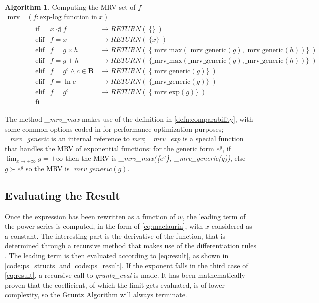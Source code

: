 \documentclass{article}
\theoremstyle{plain}
\theoremstyle{definition}
\theoremstyle{algorithm}
\newtheorem*{algo*}{Algorithm}
\begin{document}
	\begin{algo*}
		Computing the MRV set of \(f\) \\
		\[
		\begin{aligned}
			\text{mrv}\:&(f : \text{exp-log function in} \: x) \\
			&\begin{aligned}
				&\text{if} &x \ntriangleleft f & \rightarrow RETURN(\:\{\}\:) \\
				&\text{elif} &f = x & \rightarrow RETURN(\:\{x\}\:) \\
				&\text{elif} &f = g \times h & \rightarrow RETURN(\:\{\text{\_mrv\_max}(\text{\_mrv\_generic}(g), \text{\_mrv\_generic}(h))\}\:) \\
				&\text{elif} &f = g + h & \rightarrow RETURN(\:\{\text{\_mrv\_max}(\text{\_mrv\_generic}(g), \text{\_mrv\_generic}(h))\}\:) \\
				&\text{elif} &f = g^{c} \wedge c \in \mathbf{R} & \rightarrow RETURN(\:\{\text{\_mrv\_generic}(g)\}\:) \\
				&\text{elif} &f = \ln{c} & \rightarrow RETURN(\:\{\text{\_mrv\_generic}(g)\}\:) \\
				&\text{elif} &f = g^{c} & \rightarrow RETURN(\:\{\text{\_mrv\_exp}(g)\}\:) \\
				&\text{fi}
			\end{aligned}
		\end{aligned}
		\]
	\end{algo*}

	The method \textit{\_mrv\_max} makes use of the definition in \eqref{defn:comparability}, with some common options coded in for performance optimization purposes; \textit{\_mrv\_generic} is an internal reference to \textit{mrv}; \textit{\_mrv\_exp} is a special function that handles the MRV  of exponential functions: for the generic form \(e^{g}\), if \(\lim_{x \to +\infty}{g} = \pm\infty\) then the MRV is \textit{\_mrv\_max(\{\(e^{g}\)\}, \_mrv\_generic(g))}, else \(g \succ e^{g}\) so the MRV is \(\_mrv\_generic(g)\).
	
	\subsection{Evaluating the Result}
	
	Once the expression has been rewritten as a function of \(w\), the leading term of the power series is computed, in the form of \eqref{eq:maclaurin}, with \(x\) considered as a constant. The interesting part is the derivative of the function, that is determined through a recursive method that makes use of the differentiation rules \cite{wiki:diffrules}.
	The leading term is then evaluated according to \eqref{eq:result}, as shown in \cref{code:ps_structs} and \cref{code:ps_result}.
	If the exponent falls in the third case of \eqref{eq:result}, a recursive call to \textit{gruntz\_eval} is made. It has been mathematically proven that the coefficient, of which the limit gets evaluated, is of lower complexity, so the Gruntz Algorithm will always terminate.
	
\end{document}
